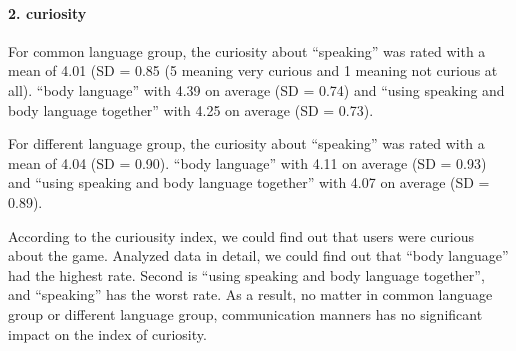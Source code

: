 \paragraph{2. curiosity}

For common language group, the curiosity about ``speaking'' was rated with a mean of 4.01 (SD = 0.85 (5 meaning very curious and 1 meaning not curious at all). ``body language'' with 4.39 on average (SD = 0.74) and ``using speaking and body language together'' with 4.25 on average (SD = 0.73).

For different language group, the curiosity about ``speaking'' was rated with a mean of 4.04 (SD = 0.90). ``body language'' with 4.11 on average (SD = 0.93) and ``using speaking and body language together'' with 4.07 on average (SD = 0.89).

According to the curiousity index, we could find out that users were curious about the game. Analyzed data in detail, we could find out that ``body language'' had the highest rate. Second is ``using speaking and body language together'', and ``speaking'' has the worst rate. As a result, no matter in common language group or different language group, communication manners has no significant impact on the index of curiosity.




